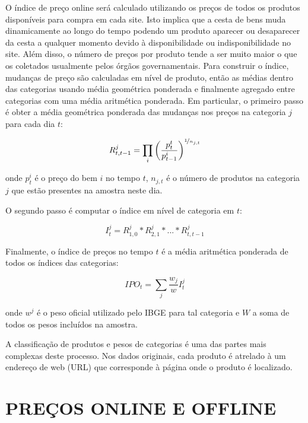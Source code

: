 \documentclass[twoside,a4paper,11pt]{report}
\begin{document}
  O índice de preço online será calculado utilizando os preços de todos os produtos disponíveis para compra em cada site. Isto implica que a cesta de bens muda dinamicamente ao longo do tempo podendo um produto aparecer ou desaparecer da cesta a qualquer momento devido à disponibilidade ou indisponibilidade no site. Além disso, o número de preços por produto tende a ser muito maior o que os coletados usualmente pelos órgãos governamentais. 
Para construir o índice, mudanças de preço são calculadas em nível de produto, então as médias dentro das categorias usando média geométrica ponderada e finalmente agregado entre categorias com uma média aritmética ponderada. Em particular, o primeiro passo é obter a média geométrica ponderada das mudanças nos preços na categoria $j$ para cada dia $t$:

\begin{equation}
R_{t,t-1}^{j}=\prod_{i}\left(\frac{p_{t}^{t}}{p_{t-1}^{i}}\right)^{\nicefrac{1}{n_{j,t}}}
\end{equation}

\noindent onde $p_{t}^{i}$ é o preço do bem $i$ no tempo $t$, $n_{j,t}$ é o número de produtos na categoria $j$ que estão presentes na amostra neste dia. 

O segundo passo é computar o índice em nível de categoria em $t$:

\begin{equation}\label{eq2}
I_{t}^{j}=R_{1,0}^{j}\ast{R}_{2,1}^{j}\ast{...}\ast{R}_{t,t-1}^{j}
\end{equation}

Finalmente, o índice de preços no tempo $t$ é a média aritmética ponderada de todos os índices das categorias:

\begin{equation}
IPO_{t}=\sum_{j}{\frac{w_{j}}{w}I_{t}^{j}} 
\end{equation}

\noindent onde $w^{j}$ é o peso oficial utilizado pelo IBGE para tal categoria e $W$ a soma de todos os pesos incluídos na amostra.

A classificação de produtos e pesos de categorias é uma das partes mais complexas deste processo. Nos dados originais, cada produto é atrelado à um endereço de web (URL) que corresponde à página onde o produto é localizado. 

\section*{PREÇOS ONLINE E OFFLINE}
\end{document}
